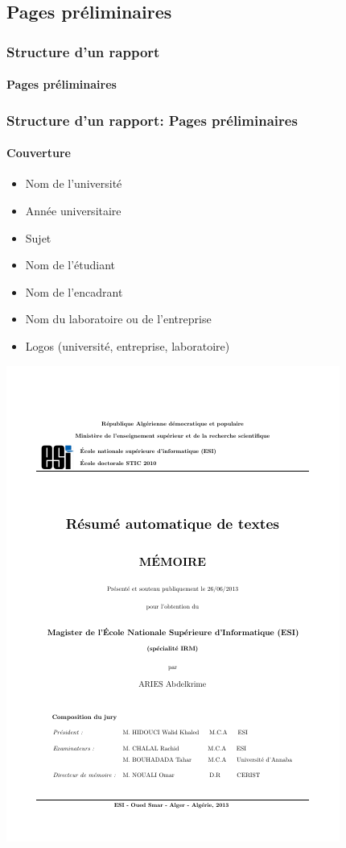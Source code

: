 \documentclass[xcolor=table]{beamer}
\begin{document}
\subsection{Pages préliminaires}

\begin{frame}
\frametitle{Structure d'un rapport}
\framesubtitle{Pages préliminaires}

\end{frame}


\begin{frame}
\frametitle{Structure d'un rapport: Pages préliminaires}
\framesubtitle{Couverture}

\begin{minipage}{0.52\textwidth}
	\begin{itemize}
		\item Nom de l'université 
		\item Année universitaire
		\item Sujet
		\item Nom de l'étudiant
		\item Nom de l'encadrant 
		\item Nom du laboratoire ou de l'entreprise
		\item Logos (université, entreprise, laboratoire)
	\end{itemize}
\end{minipage}
\begin{minipage}{0.42\textwidth}
	\includegraphics[width=\textwidth]{..//img/Bweb03-redaction/couverture.png}
\end{minipage}


\end{frame}
\end{document}
